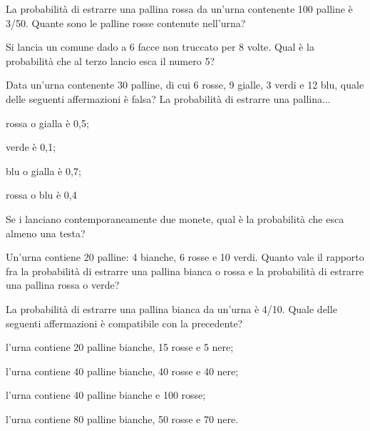 \begin{esercizio} %
La probabilità di estrarre una pallina rossa da un'urna contenente 100 palline è 
3/50. Quante sono le palline rosse contenute nell'urna?
\end{esercizio}

\begin{esercizio} %
Si lancia un comune dado a 6 facce non truccato per 8 volte. Qual è la 
probabilità che al terzo lancio esca il numero 5?
\end{esercizio}

\begin{esercizio} %
Data un'urna contenente 30 palline, di cui 6 rosse, 9 gialle, 3 verdi e 12 blu, 
quale delle seguenti affermazioni è falsa? La probabilità di estrarre una 
pallina...
\begin{itemize*}
\item rossa o gialla è 0,5;
\item verde è 0,1;
\item blu o gialla è 0,7;
\item rossa o blu è 0,4
\end{itemize*}
\end{esercizio}

\begin{esercizio} %
Se i lanciano contemporaneamente due monete, qual è la probabilità che esca 
almeno una testa?
\end{esercizio}

\begin{esercizio} %
Un'urna contiene 20 palline: 4 bianche, 6 rosse e 10 verdi. Quanto vale il 
rapporto fra la probabilità di estrarre una pallina bianca o rossa e la 
probabilità di estrarre una pallina rossa o verde?
\end{esercizio}

\begin{esercizio} %
La probabilità di estrarre una pallina bianca da un'urna è 4/10. Quale delle 
seguenti affermazioni è compatibile con la precedente?
\begin{itemize*}
\item l'urna contiene 20 palline bianche, 15 rosse e 5 nere;
\item l'urna contiene 40 palline bianche, 40 rosse e 40 nere;
\item l'urna contiene 40 palline bianche e 100 rosse;
\item l'urna contiene 80 palline bianche, 50 rosse e 70 nere.
\end{itemize*}
\end{esercizio}

